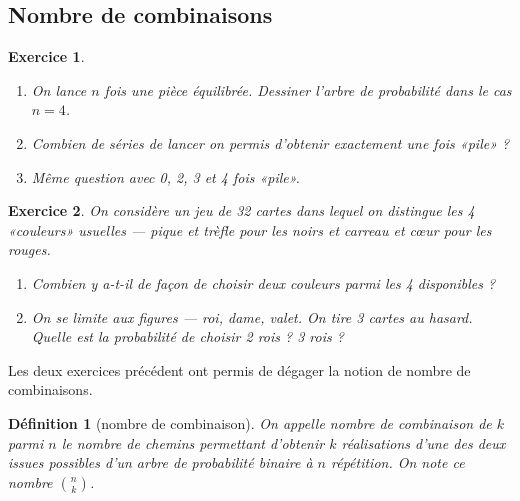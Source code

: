\documentclass[a4ppaer,12pt,french]{article}
\newtheorem{definition}{Définition}
\newtheorem{exercice}{Exercice}
\begin{document}
\subsection{Nombre de combinaisons}

\begin{mdframed}
  \begin{exercice}
    \begin{enumerate}
      \item \emph{On lance $n$ fois une pièce équilibrée. Dessiner
        l'arbre de probabilité dans le cas $n = 4$.}\\[4.8cm]
      \item \emph{Combien de séries de lancer on permis d'obtenir
        exactement une fois «pile» ?}\\[1.6cm]
      \item \emph{Même question avec 0, 2, 3 et 4 fois «pile».}\\[1.6cm]
    \end{enumerate}
  \end{exercice}
\end{mdframed}

\begin{mdframed}
  \begin{exercice}
    On considère un jeu de 32 cartes dans lequel on distingue les 4
    «couleurs» usuelles --- pique et trèfle pour les noirs et carreau et
    cœur pour les rouges.
    \begin{enumerate}
      \item Combien y a-t-il de façon de choisir deux couleurs parmi les
        4 disponibles ?
      \item On se limite aux figures --- roi, dame, valet. On tire 3
        cartes au hasard. Quelle est la probabilité de choisir 2 rois ?
        3 rois ?
        \vspace{3.2cm}
    \end{enumerate}
  \end{exercice}
\end{mdframed}

Les deux exercices précédent ont permis de dégager la notion de
nombre de combinaisons.

\begin{definition}[nombre de combinaison]
  On appelle \emph{nombre de combinaison} de $k$ parmi $n$ le nombre de
  chemins permettant d'obtenir $k$ réalisations d'une des deux issues
  possibles d'un arbre de probabilité binaire à $n$ répétition. On note
  ce nombre $\binom{n}{k}$.
\end{definition}
\end{document}
